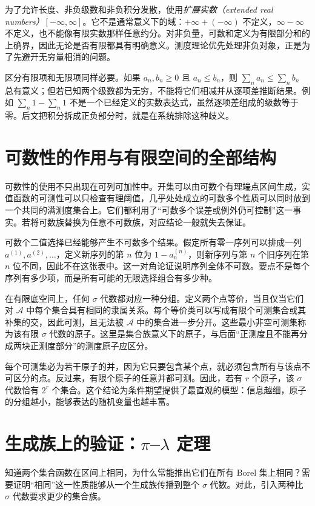 为了允许长度、非负级数和非负积分发散，使用\emph{扩展实数（extended real numbers）}$[-\infty,\infty]$。它不是通常意义下的域：$+\infty+(-\infty)$ 不定义，$\infty-\infty$ 不定义，也不能像有限实数那样任意约分。对非负量，可数和定义为有限部分和的上确界，因此无论是否有限都具有明确意义。测度理论优先处理非负对象，正是为了先避开无穷量相消的问题。

区分有限项和无限项同样必要。如果 $a_n,b_n\geq0$ 且 $a_n\leq b_n$，则 $\sum_na_n\leq\sum_nb_n$ 总有意义；但若已知两个级数都为无穷，不能将它们相减并从逐项差推断结果。例如 $\sum_n1-\sum_n1$ 不是一个已经定义的实数表达式，虽然逐项差组成的级数等于零。后文把积分拆成正负部分时，就是在系统排除这种歧义。

\section{可数性的作用与有限空间的全部结构}
可数性的使用不只出现在可列可加性中。开集可以由可数个有理端点区间生成，实值函数的可测性可以只检查有理阈值，几乎处处成立的可数多个性质可以同时放到一个共同的满测度集合上。它们都利用了“可数多个误差或例外仍可控制”这一事实。若将可数族替换为任意不可数族，对应结论一般就失去保证。

可数个二值选择已经能够产生不可数多个结果。假定所有零一序列可以排成一列 $a^{(1)},a^{(2)},\ldots$，定义新序列的第 $n$ 位为 $1-a^{(n)}_n$，则新序列与第 $n$ 个旧序列在第 $n$ 位不同，因此不在这张表中。这一对角论证说明序列全体不可数。要点不是每个序列有多少项，而是所有可能的无限选择组合有多少种。

在有限底空间上，任何 $\sigma$ 代数都对应一种分组。定义两个点等价，当且仅当它们对 $\mathcal A$ 中每个集合具有相同的隶属关系。每个等价类可以写成有限个可测集合或其补集的交，因此可测，且无法被 $\mathcal A$ 中的集合进一步分开。这些最小非空可测集称为该有限 $\sigma$ 代数的原子。这里是集合族意义下的原子，与后面“正测度且不能再分成两块正测度部分”的测度原子应区分。

每个可测集必为若干原子的并，因为它只要包含某个点，就必须包含所有与该点不可区分的点。反过来，有限个原子的任意并都可测。因此，若有 $r$ 个原子，该 $\sigma$ 代数恰有 $2^r$ 个集合。这个结论为条件期望提供了最直观的模型：信息越细，原子的分组越小，能够表达的随机变量也越丰富。

\section{生成族上的验证：$\pi$--$\lambda$ 定理}
\label{sec:mt-pi-lambda}
知道两个集合函数在区间上相同，为什么常能推出它们在所有 Borel 集上相同？需要证明“相同”这一性质能够从一个生成族传播到整个 $\sigma$ 代数。对此，引入两种比 $\sigma$ 代数要求更少的集合族。

